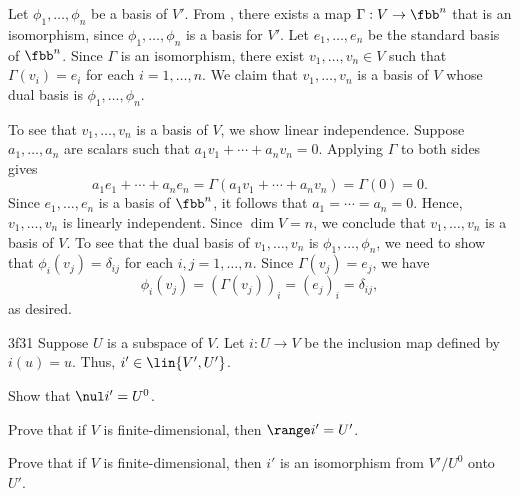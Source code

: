 \begin{sol}
    Let $\phi_1, \ldots, \phi_n$ be a basis of $V'$.
	From , there exists a map $\Gamma : V \to \fbb^n$ that is an isomorphism, since $\phi_1, \ldots, \phi_n$ is a basis for $V'$.
	Let $e_1, \ldots, e_n$ be the standard basis of $\fbb^n$.
	Since $\Gamma$ is an isomorphism, there exist $v_1, \ldots, v_n \in V$ such that $\Gamma(v_i) = e_i$ for each $i = 1, \ldots, n$.
	We claim that $v_1, \ldots, v_n$ is a basis of $V$ whose dual basis is $\phi_1, \ldots, \phi_n$.

    To see that $v_1, \ldots, v_n$ is a basis of $V$, we show linear independence.
	Suppose $a_1, \ldots, a_n$ are scalars such that $a_1 v_1 + \cdots + a_n v_n = 0$.
	Applying $\Gamma$ to both sides gives
    \[
    	a_1 e_1 + \cdots + a_n e_n = \Gamma(a_1 v_1 + \cdots + a_n v_n) = \Gamma(0) = 0.
    \]
    Since $e_1, \ldots, e_n$ is a basis of $\fbb^n$, it follows that $a_1 = \cdots = a_n = 0$.
	Hence, $v_1, \ldots, v_n$ is linearly independent.
	Since $\dim V = n$, we conclude that $v_1, \ldots, v_n$ is a basis of $V$.
	To see that the dual basis of $v_1, \ldots, v_n$ is $\phi_1, \ldots, \phi_n$, we need to show that $\phi_i(v_j) = \delta_{ij}$ for each $i, j = 1, \ldots, n$.
	Since $\Gamma(v_j) = e_j$, we have
    \[
    	\phi_i(v_j) = (\Gamma(v_j))_i = (e_j)_i = \delta_{ij},
    \]
    as desired.
\end{sol}

\begin{exercise}{3f31}
    Suppose $U$ is a subspace of $V$.
	Let $i: U \to V$ be the inclusion map defined by $i(u) = u$.
	Thus, $i' \in \lin{V', U'}$.
    \begin{subexercises}
        \item Show that $\nul i' = U^0$.
        \item Prove that if $V$ is finite-dimensional, then $\range i' = U'$.
        \item Prove that if $V$ is finite-dimensional, then $i'$ is an isomorphism from $V' / U^0$ onto $U'$.
    \end{subexercises}
\end{exercise}

